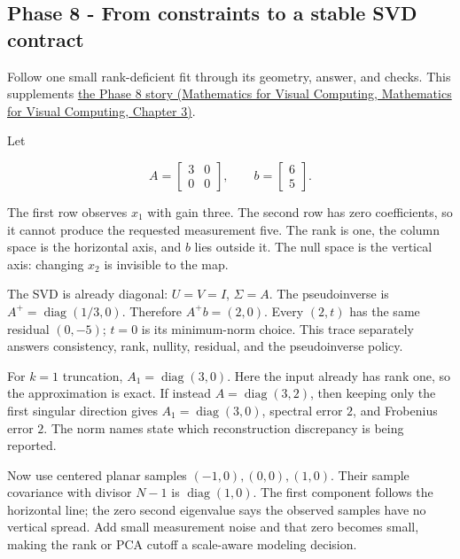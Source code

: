 \subsection{Phase 8 - From constraints to a stable SVD contract}\label{appendix-92ff77d4dfdc-phase-8---from-constraints-to-a-stable-svd-contract}

Follow one small rank-deficient fit through its geometry, answer, and checks. This supplements \href{../02-Mathematics-for-Visual-Computing/main.pdf\#nameddest=01-foundations-i-ch019-the-graphics-problem-hiding-inside-a-matrix-equation}{the Phase 8 story (Mathematics for Visual Computing, Mathematics for Visual Computing, Chapter 3)}.

Let

\[
A=\begin{bmatrix}3&0\\0&0\end{bmatrix},\qquad
b=\begin{bmatrix}6\\5\end{bmatrix}.
\]

The first row observes \(x_1\) with gain three. The second row has zero coefficients, so it cannot produce the requested measurement five. The rank is one, the column space is the horizontal axis, and \(b\) lies outside it. The null space is the vertical axis: changing \(x_2\) is invisible to the map.

The SVD is already diagonal: \(U=V=I\), \(\Sigma=A\). The pseudoinverse is \(A^+=\operatorname{diag}(1/3,0)\). Therefore \(A^+b=(2,0)\). Every \((2,t)\) has the same residual \((0,-5)\); \(t=0\) is its minimum-norm choice. This trace separately answers consistency, rank, nullity, residual, and the pseudoinverse policy.

For \(k=1\) truncation, \(A_1=\operatorname{diag}(3,0)\). Here the input already has rank one, so the approximation is exact. If instead \(A=\operatorname{diag}(3,2)\), then keeping only the first singular direction gives \(A_1=\operatorname{diag}(3,0)\), spectral error \(2\), and Frobenius error \(2\). The norm names state which reconstruction discrepancy is being reported.

Now use centered planar samples \((-1,0),(0,0),(1,0)\). Their sample covariance with divisor \(N-1\) is \(\operatorname{diag}(1,0)\). The first component follows the horizontal line; the zero second eigenvalue says the observed samples have no vertical spread. Add small measurement noise and that zero becomes small, making the rank or PCA cutoff a scale-aware modeling decision.


